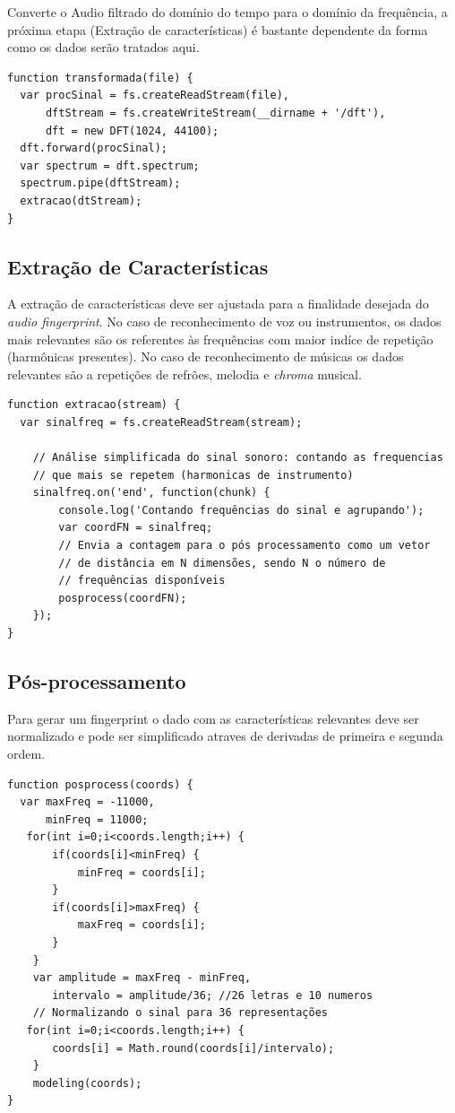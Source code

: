Converte o Audio filtrado do domí­nio do tempo para o domí­nio da frequência,  a próxima etapa (Extração de caracterí­sticas) é bastante dependente da forma como os dados serão tratados aqui.
	
\begin{verbatim}
function transformada(file) {
  var procSinal = fs.createReadStream(file),
      dftStream = fs.createWriteStream(__dirname + '/dft'),
      dft = new DFT(1024, 44100);
  dft.forward(procSinal);
  var spectrum = dft.spectrum;
  spectrum.pipe(dftStream);
  extracao(dtStream);
}
\end{verbatim}


\subsection{Extração de Características}
\label{ss.extracaocaracteristicas}

A extração de características deve ser ajustada para a finalidade desejada do \emph{audio fingerprint}. No caso de reconhecimento de voz ou instrumentos, os dados mais relevantes são os referentes às frequências com maior indíce de repetição (harmônicas presentes). No caso de reconhecimento de músicas os dados relevantes são a repetições de refrões, melodia e \emph{chroma} musical.

\begin{verbatim}
function extracao(stream) {
  var sinalfreq = fs.createReadStream(stream);

    // Análise simplificada do sinal sonoro: contando as frequencias
    // que mais se repetem (harmonicas de instrumento)
    sinalfreq.on('end', function(chunk) {
        console.log('Contando frequências do sinal e agrupando');
        var coordFN = sinalfreq;
        // Envia a contagem para o pós processamento como um vetor
        // de distância em N dimensões, sendo N o número de 
        // frequências disponíveis
        posprocess(coordFN);
    });
}
\end{verbatim}


\subsection{Pós-processamento}
\label{ss.posprocessamento}

Para gerar um fingerprint o dado com as características relevantes deve ser normalizado e pode ser simplificado atraves de derivadas de primeira e segunda ordem.

\begin{verbatim}
function posprocess(coords) {
  var maxFreq = -11000,
      minFreq = 11000;
   for(int i=0;i<coords.length;i++) {
       if(coords[i]<minFreq) {
           minFreq = coords[i];
       }
       if(coords[i]>maxFreq) {
           maxFreq = coords[i];
       }
    }
    var amplitude = maxFreq - minFreq,
       intervalo = amplitude/36; //26 letras e 10 numeros
    // Normalizando o sinal para 36 representações
   for(int i=0;i<coords.length;i++) {
       coords[i] = Math.round(coords[i]/intervalo);
    }
    modeling(coords);
}
\end{verbatim}

